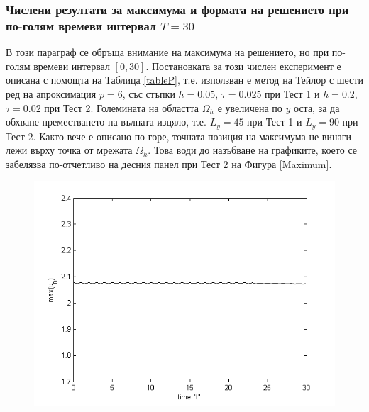 \documentclass[a4paper]{article}
\theoremstyle{remark}
\begin{document}
\begin{large}
\subsubsection{Числени резултати за максимума и формата на решението при по-голям времеви интервал $T=30$}
В този параграф се обръща внимание на максимума на решението, но при по-голям времеви интервал $[0, 30]$. Постановката за този числен експеримент е описана с помощта на Таблица \ref{tableP}, т.е. използван е метод на Тейлор с шести ред на апроксимация $p=6$, със стъпки $h=0.05$, $\tau = 0.025$ при Тест 1 и $h=0.2$,  $\tau=0.02$ при Тест 2. Големината на областта $\Omega_h$ е увеличена по $y$ оста, за да обхване преместването на вълната изцяло, т.е. $L_y = 45$ при Тест 1 и $L_y = 90$ при Тест 2. Както вече е описано по-горе, точната позиция на максимума не винаги лежи върху точка от мрежата $\Omega_h$. Това води до назъбване на графиките, което се забелязва по-отчетливо на десния панел при Тест 2 на Фигура \ref{Maximum}.
\begin{figure}\vspace{0.2cm}
	\centering
	\begin{minipage}[b]{0.40\linewidth}
		\includegraphics[width=\linewidth]{../amitans/figures/maximum_30_T30_bt3_c045_h005.png}
	\end{minipage}
	\begin{minipage}[b]{0.40\linewidth}

\end{minipage}
\end{figure}
\end{large}
\end{document}
